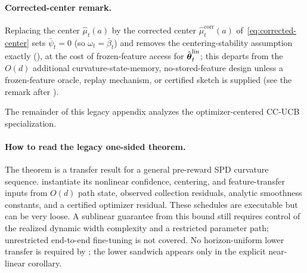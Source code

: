 \paragraph{Corrected-center remark.}
Replacing the center $\widehat\mu_t(a)$ by the corrected center
$\widehat\mu_t^{\mathrm{corr}}(a)$ of~\eqref{eq:corrected-center} sets $\bar\psi_t=0$
(so $\omega_t=\bar\beta_t$) and removes the centering-stability assumption
exactly (), at the cost of frozen-feature access for
$\hat{\boldsymbol{\theta}}_t^{\mathrm{lin}}$; this departs from the $O(d)$ additional
curvature-state-memory,
no-stored-feature design unless a frozen-feature oracle, replay mechanism, or
certified sketch is supplied (see the remark after
).

The remainder of this legacy appendix analyzes the optimizer-centered CC-UCB
specialization.



\paragraph{How to read the legacy one-sided theorem.}
The theorem is a transfer result for a general pre-reward SPD curvature
sequence.   instantiate its
nonlinear confidence, centering, and feature-transfer inputs from $O(d)$ path
state, observed collection residuals, analytic smoothness constants, and a
certified optimizer residual.  These schedules are executable but can be very
loose.  A sublinear guarantee from this bound still requires control of the realized dynamic width
complexity and a restricted parameter path; unrestricted end-to-end fine-tuning
is not covered.  No horizon-uniform lower transfer is required by
; the lower sandwich appears only in the explicit near-linear
corollary.


